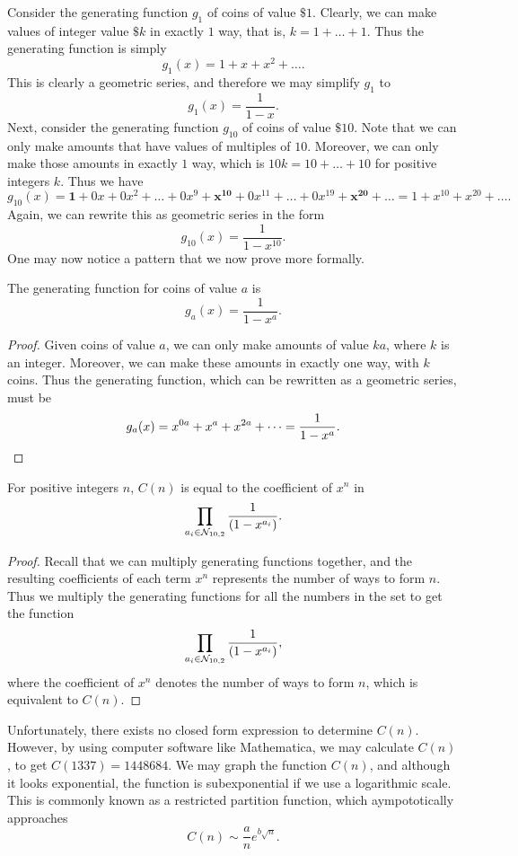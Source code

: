 \documentclass{article}
\begin{document}
Consider the generating function $g_1$ of coins of value $\$ 1$. Clearly, we can make values of integer value $\$ k$ in exactly $1$ way, that is, $k = 1 + \dots + 1$. Thus the generating function is simply \[
  g_{1}(x) = 1 + x + x^2 + \dots
.\] This is clearly a geometric series, and therefore we may simplify $g_1$ to \[
  g_1(x) = \frac{1}{1-x}
.\] Next, consider the generating function $g_{10}$ of coins of value $\$ 10$. Note that we can only make amounts that have values of multiples of  $10$. Moreover, we can only make those amounts in exactly $1$ way, which is $10k = 10 + \dots + 10$ for positive integers $k$. Thus we have \[
g_{10}(x) = \bm{1} + 0x + 0x^2 + \dots + 0x^{9} + \bm{x^{10}} + 0x^{11} + \dots + 0x^{19} + \bm{x^{20}} + \dots = 1 + x^{10} + x^{20} + \dots
.\] Again, we can rewrite this as geometric series in the form \[
  g_{10}(x) = \frac{1}{1-x^{10}}
.\] One may now notice a pattern that we now prove more formally.
\begin{theorem}
  The generating function for coins of value $a$ is \[
    g_a(x) = \frac{1}{1-x^a}
  .\] 
\end{theorem}
\begin{proof}
  Given coins of value $a$, we can only make amounts of value $ka$, where $k$ is an integer. Moreover, we can make these amounts in exactly one way, with $k$ coins. Thus the generating function, which can be rewritten as a geometric series, must be \[
    g_a(x) = x^{0a} + x^{a} + x^{2a} + \dots = \frac{1}{1-x^{a}} \qedhere
  .\] 
\end{proof}
\begin{theorem}
  For positive integers $n$, $C(n)$ is equal to the coefficient of $x^{n}$ in \[
    \prod_{a_i \in \mathcal{N}_{10, 2}} \frac{1}{(1-x^{a_i})}
  .\] 
\end{theorem}
\begin{proof}
  Recall that we can multiply generating functions together, and the resulting coefficients of each term $x^{n}$ represents the number of ways to form $n$. Thus we multiply the generating functions for all the numbers in the set \NTen to get the function \[
    \prod_{a_i\in \mathcal{N}_{10, 2}} \frac{1}{(1-x^{a_i})}
  ,\] where the coefficient of $x^n$ denotes the number of ways to form $n$, which is equivalent to $C(n)$.
\end{proof}
Unfortunately, there exists no closed form expression to determine $C(n)$. %
However, by using computer software like Mathematica, we may calculate $C(n)$, to get $C(1337) = 1448684$. We may graph the function $C(n)$, and although it looks exponential, the function is subexponential if we use a logarithmic scale. This is commonly known as a restricted partition function, which aympototically approaches \[
  C(n) \sim \frac{a}{n}e^{b\sqrt{n}}
.\] %
\end{document}

